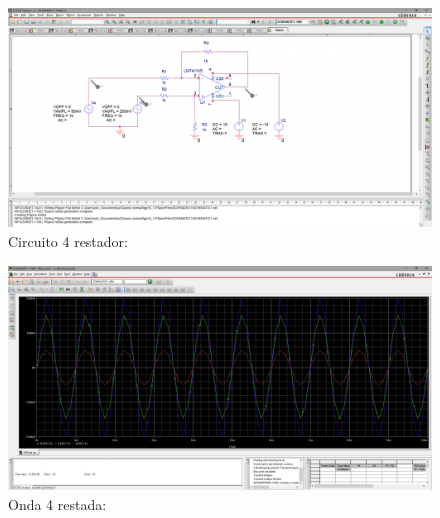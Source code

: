 \documentclass[letterpaper]{article}
\begin{document}
\begin{figure}[htbp]
    \centering
    \includegraphics[width=18cm]{IMG/cir(2).png}
    \caption{Circuito 4 restador:}
    \label{fig:my_label}
\end{figure}
\begin{figure}[htbp]
    \centering
    \includegraphics[width=18cm]{IMG/ond(2).png}
    \caption{Onda 4 restada: }
    \label{fig:my_label}
\end{figure}
\end{document}
